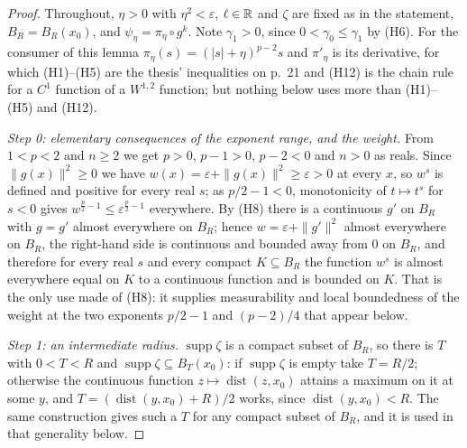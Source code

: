\begin{proof}
Throughout, $\eta>0$ with $\eta^2<\varepsilon$, $\ell\in\mathbb{R}$ and $\zeta$ are
fixed as in the statement, $B_R=B_R(x_0)$, and
$\psi_\eta=\pi_\eta\circ g^k$.  Note $\gamma_1>0$, since $0<\gamma_0\le\gamma_1$
by (H6).  For the consumer of this lemma $\pi_\eta(s)=(|s|+\eta)^{p-2}s$ and
$\pi'_\eta$ is its derivative, for which (H1)--(H5) are the thesis'
inequalities on p.~21 and (H12) is the chain rule for a $C^1$ function of a
$W^{1,2}$ function; but nothing below uses more than (H1)--(H5) and (H12).

\emph{Step 0: elementary consequences of the exponent range, and the weight.}
From $1<p<2$ and $n\ge2$ we get $p>0$, $p-1>0$, $p-2<0$ and $n>0$ as reals.
Since $\|g(x)\|^2\ge0$ we have $w(x)=\varepsilon+\|g(x)\|^2\ge\varepsilon>0$ at
every $x$, so $w^{s}$ is defined and positive for every real $s$; as
$p/2-1<0$, monotonicity of $t\mapsto t^{s}$ for $s<0$ gives
$w^{\frac p2-1}\le\varepsilon^{\frac p2-1}$ everywhere.  By (H8) there is a
continuous $g'$ on $B_R$ with $g=g'$ almost everywhere on $B_R$; hence
$w=\varepsilon+\|g'\|^2$ almost everywhere on $B_R$, the right-hand side is
continuous and bounded away from $0$ on $B_R$, and therefore for every real $s$
and every compact $K\subseteq B_R$ the function $w^{s}$ is almost everywhere
equal on $K$ to a continuous function and is bounded on $K$.  That is the only
use made of (H8): it supplies measurability and local boundedness of the
weight at the two exponents $p/2-1$ and $(p-2)/4$ that appear below.

\emph{Step 1: an intermediate radius.}  $\operatorname{supp}\zeta$ is a compact
subset of $B_R$, so there is $T$ with $0<T<R$ and
$\operatorname{supp}\zeta\subseteq B_T(x_0)$: if $\operatorname{supp}\zeta$ is
empty take $T=R/2$; otherwise the continuous function
$z\mapsto\operatorname{dist}(z,x_0)$ attains a maximum on it at some $y$, and
$T=(\operatorname{dist}(y,x_0)+R)/2$ works, since
$\operatorname{dist}(y,x_0)<R$.  The same construction gives such a $T$ for any
compact subset of $B_R$, and it is used in that generality below.


\end{proof}
